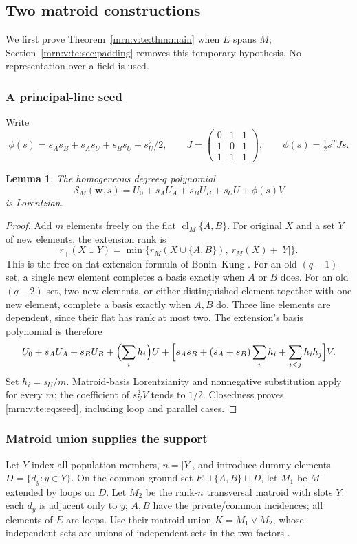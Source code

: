 \documentclass[11pt,a4paper]{article}
\newtheorem{lemma}[theorem]{Lemma}
\theoremstyle{remark}\newtheorem{remark}[theorem]{Remark}
\newcommand{\cl}{\operatorname{cl}}        %
\begin{document}
\subsection{Two matroid constructions}\label{mrn:v:te:sec:constructions}
We first prove Theorem~\ref{mrn:v:te:thm:main} when $E$ spans $M$; Section~\ref{mrn:v:te:sec:padding} removes this temporary hypothesis. No representation over a field is used.

\subsubsection{A principal-line seed}
Write
\[
 \phi(s)=s_As_B+s_As_U+s_Bs_U+s_U^2/2,
 \qquad J=\begin{pmatrix}0&1&1\\1&0&1\\1&1&1\end{pmatrix},
 \qquad \phi(s)=\tfrac12s^TJs.
\]
\begin{lemma}\label{mrn:v:te:lem:seed}
The homogeneous degree-$q$ polynomial
\begin{equation}\label{mrn:v:te:eq:seed}
 \mathcal S_M(\mathbf w,s)=U_0+s_AU_A+s_BU_B+s_UU+\phi(s)V
\end{equation}
is Lorentzian.
\end{lemma}
\begin{proof}
Add $m$ elements freely on the flat $\cl_M\{A,B\}$. For original $X$ and a set $Y$ of new elements, the extension rank is
\begin{equation}\label{mrn:v:te:eq:principal}
 r_+(X\cup Y)=\min\{r_M(X\cup\{A,B\}),\ r_M(X)+|Y|\}.
\end{equation}
This is the free-on-flat extension formula of Bonin--Kung \cite[Lemma 3.1]{b:BK}. For an old $(q-1)$-set, a single new element completes a basis exactly when $A$ or $B$ does. For an old $(q-2)$-set, two new elements, or either distinguished element together with one new element, complete a basis exactly when $A,B$ do. Three line elements are dependent, since their flat has rank at most two. The extension's basis polynomial is therefore
\[
 U_0+s_AU_A+s_BU_B+\Bigl(\sum_i h_i\Bigr)U
 +\Bigl[s_As_B+(s_A+s_B)\sum_i h_i+\sum_{i<j}h_ih_j\Bigr]V.
\]
Set $h_i=s_U/m$. Matroid-basis Lorentzianity and nonnegative substitution apply for every $m$; the coefficient of $s_U^2V$ tends to $1/2$. Closedness proves \eqref{mrn:v:te:eq:seed}, including loop and parallel cases.
\end{proof}

\subsubsection{Matroid union supplies the support}
Let $Y$ index all population members, $n=|Y|$, and introduce dummy elements $D=\{d_y:y\in Y\}$. On the common ground set $E\sqcup\{A,B\}\sqcup D$, let $M_1$ be $M$ extended by loops on $D$. Let $M_2$ be the rank-$n$ transversal matroid with slots $Y$: each $d_y$ is adjacent only to $y$; $A,B$ have the private/common incidences; all elements of $E$ are loops. Use their matroid union $K=M_1\vee M_2$, whose independent sets are unions of independent sets in the two factors \cite[Section 2]{b:BK}.
\end{document}
